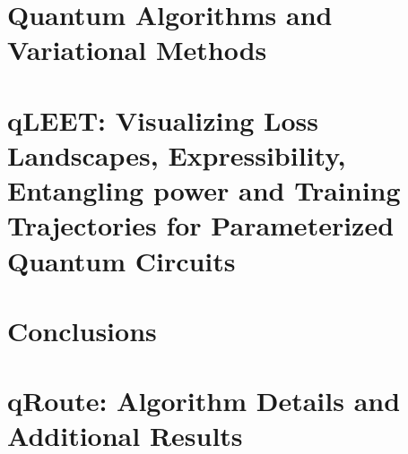 \documentclass[11pt]{book}
\begin{document}

\chapter{Quantum Algorithms and Variational Methods}
\label{ch:algos}



\chapter{qLEET: Visualizing Loss Landscapes, Expressibility, Entangling power and Training Trajectories for Parameterized Quantum Circuits}
\label{ch:qleet}



\chapter{Conclusions}
\label{ch:conc}



\appendix
\chapter{qRoute: Algorithm Details and Additional Results}
\label{ch:appendix-qroute}


% 



 
\end{document}
